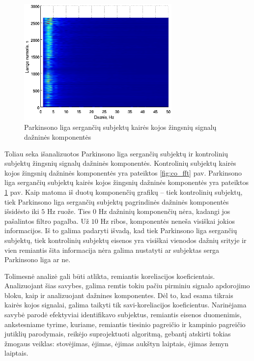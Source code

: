 \documentclass[]{vgtuef}
\begin{document}
\begin{figure}[!t]
  \centering
  \includegraphics[width=300px]{figures/pt_fft.eps}
  \caption{Parkinsono liga sergančių subjektų kairės kojos žingsnių signalų dažninės komponentės}
  \label{fig:pt_fft}
\end{figure}


Toliau seka išanalizuotos Parkinsono liga sergančių subjektų ir kontrolinių subjektų žingsnių signalų dažninės komponentės. Kontrolinių subjektų kairės kojos žingsnių dažninės komponentės yra pateiktos \ref{fig:co_fft} pav. Parkinsono liga sergančių subjektų kairės kojos žingsnių dažninės komponentės yra pateiktos \ref{fig:pt_fft} pav. Kaip matoma iš duotų komponenčių grafikų -- tiek kontrolinių subjektų, tiek Parkinsono liga sergančių subjektų pagrindinės dažninės komponentės išsidėsto iki $5$ Hz ruože. Ties $0$ Hz dažninių komponenčių nėra, kadangi jos pašalintos filtro pagalba. Už $10$ Hz ribos, komponentės neneša visiškai jokios informacijos. Iš to galima padaryti išvadą, kad tiek Parkinsono liga sergančių subjektų, tiek kontrolinių subjektų eisenos yra visiškai vienodos dažnių srityje ir vien remiantis šita informacija nėra galima nustatyti ar subjektas serga Parkinsono liga ar ne.

Tolimesnė analizė gali būti atlikta, remiantis koreliacijos koeficientais. Analizuojant šias savybes, galima remtis tokiu pačiu pirminiu signalo apdorojimo bloku, kaip ir analizuojant dažnines komponentes. Dėl to, kad esama tikrais kairės kojos signalai, galima taikyti tik savi-koreliacijos koeficientus. Narinėjama savybė parodė efektyviai identifikavo subjektus, remiantis eisenos duomenimis, ankstesniame tyrime, kuriame, remiantis tiesinio pagreičio ir kampinio pagreičio jutiklių parodymais, reikėjo suprojektuoti algoritmą, gebantį atskirti tokias žmogaus veiklas: stovėjimas, ėjimas, ėjimas aukštyn laiptais, ėjimas žemyn laiptais.
\end{document}
